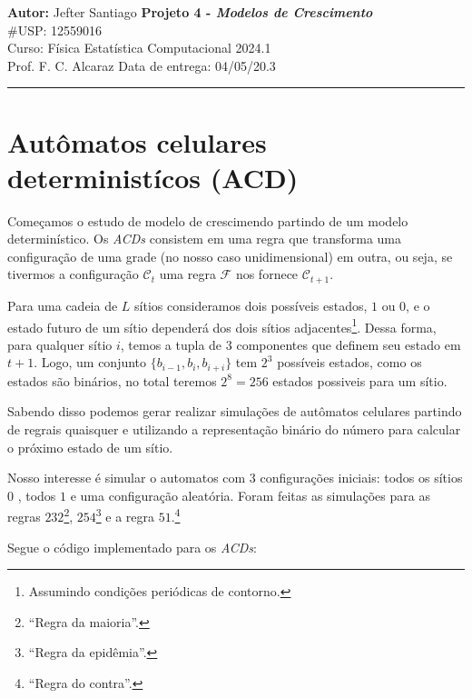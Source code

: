 \documentclass[a4paper, 11pt]{tufte-handout}
\begin{document}
\noindent
\large\textbf{Autor:} Jefter Santiago \hfill \textbf{Projeto 4 - {\color{blue}\emph{Modelos de Crescimento}}}   \\
\#USP: 12559016 \\
\normalsize Curso: Física Estatística Computacional \hfill 2024.1 \\
Prof. F. C. Alcaraz \hfill Data de entrega: 04/05/20.3 \\
\noindent\rule{7in}{2.8pt}



\section{Autômatos celulares deterministícos (ACD)}

Começamos o estudo de modelo de crescimendo partindo de um modelo determinístico. Os
\emph{ACDs} consistem em uma regra que transforma uma configuração de uma grade (no nosso
caso unidimensional) em outra, ou seja, se tivermos a configuração \( \mathcal{C}_{t}\) uma regra \( \mathcal{F}\)
nos fornece \( \mathcal{C}_{t + 1} \).

Para uma cadeia de \( L \) sítios consideramos dois possíveis estados, \( 1 \) ou \( 0 \), e o
estado futuro de um sítio dependerá dos dois sítios adjacentes\footnote{Assumindo condições
periódicas de contorno.}. Dessa forma, para qualquer sítio \( i \), temos a tupla de \( 3 \)
componentes que definem seu estado em \( t + 1 \). Logo, um conjunto \( \{ b_{i-1}, b_i, b_{i+i} \}
\) tem \( 2^3 \) possíveis estados, como os estados são binários, no total teremos \( 2^{8} = 256 \)
estados possiveis para um sítio.


Sabendo disso podemos gerar realizar simulações de autômatos celulares partindo de regrais quaisquer
e utilizando a representação binário do número para calcular o próximo estado de um sítio.



Nosso interesse é simular o automatos com 3 configurações iniciais: todos os sítios \( 0 \) , todos
\( 1 \) e uma configuração aleatória. Foram feitas as simulações para as regras $232$\footnote{``Regra
  da maioria''.}, \( 254 \)\footnote{``Regra da epidêmia''.} e a regra  $51$.\footnote{``Regra do contra''.}


Segue o código implementado para os \emph{ACDs}:
\end{document}
